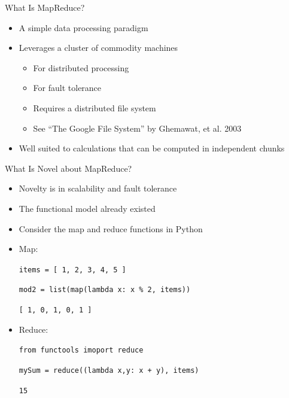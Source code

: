 \documentclass[aspectratio=169]{beamer}
\begin{document}
\begin{frame}{What Is MapReduce?}

\begin{itemize}
\item A simple data processing paradigm
\item Leverages a cluster of commodity machines
\begin{itemize}
\item For distributed processing
\item For fault tolerance
\item Requires a distributed file system %
\item See ``The Google File System'' by Ghemawat, et al. 2003
\end{itemize}
\item Well suited to calculations that can be computed in independent chunks
\end{itemize}
\end{frame}

\begin{frame}[fragile]{What Is Novel about MapReduce?}

\begin{itemize}
\item  Novelty is in scalability and fault tolerance
\item The functional model already existed
\item Consider the map and reduce functions in Python
\item Map:


\texttt{items = [ 1, 2, 3, 4, 5 ]}

\texttt{mod2 = list(map(lambda x: x \% 2, items))}

\hspace{4.75em}\texttt{[ 1, 0, 1, 0, 1 ]}

\item Reduce:

\texttt{from functools imoport reduce}

\texttt{mySum = reduce((lambda x,y: x + y), items)}

\texttt{15}
\end{itemize}
\end{frame}
\end{document}
